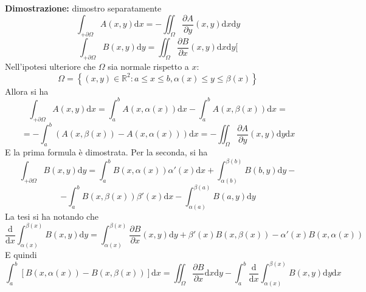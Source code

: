 \documentclass[a4paper,11pt]{article}
\begin{document}
\begin{enumerate}
	\textbf{Dimostrazione:} dimostro separatamente
	\[\int_{+\partial\Omega}A(x,y)\mathrm{d}x=-\iint_\Omega\frac{\partial A}{\partial y}(x,y)\mathrm{d}x\mathrm{d}y\]
	\[\int_{+\partial\Omega}B(x,y)\mathrm{d}y=\iint_\Omega\frac{\partial B}{\partial x}(x,y)\mathrm{d}x\mathrm{d}y[\]
	Nell'ipotesi ulteriore che $\Omega$ sia normale rispetto a $x$:
	\[\Omega=\left\{(x,y)\in\mathbb{R}^2:a\leq x\leq b, \alpha(x)\leq y\leq \beta(x)\right\}\]
	Allora si ha
	\[\int_{+\partial\Omega}A(x,y)\mathrm{d}x=\int_{a}^{b}A(x,\alpha(x))\mathrm{d}x-\int_{a}^{b}A(x,\beta(x))\mathrm{d}x=\]\[=-\int_{a}^{b}\left(A(x,\beta(x))-A(x,\alpha(x))\right)\mathrm{d}x=-\iint_\Omega\frac{\partial A}{\partial y}(x,y)\mathrm{d}y\mathrm{d}x\]
	E la prima formula è dimostrata. Per la seconda, si ha
	\[\int_{+\partial\Omega}B(x,y)\mathrm{d}y=\int_{a}^{b}B(x,\alpha(x))\alpha'(x)\mathrm{d}x+\int_{\alpha(b)}^{\beta(b)}B(b,y)\mathrm{d}y-\]\[-\int_{a}^{b}B(x,\beta(x))\beta'(x)\mathrm{d}x-\int_{\alpha(a)}^{\beta(a)}B(a,y)\mathrm{d}y\]
	La tesi si ha notando che
	\[\frac{\mathrm{d}}{\mathrm{d}x}\int_{\alpha(x)}^{\beta(x)}B(x,y)\mathrm{d}y=\int_{\alpha(x)}^{\beta(x)}\frac{\partial B}{\partial x}(x,y)\mathrm{d}y+\beta'(x)B(x,\beta(x))-\alpha'(x)B(x,\alpha(x))\]
	E quindi 
	\[\int_{a}^{b}\left[B(x,\alpha(x))-B(x,\beta(x))\right]\mathrm{d}x=\iint_\Omega\frac{\partial B}{\partial x}\mathrm{d}x\mathrm{d}y-\int_{a}^{b}\frac{\mathrm{d}}{\mathrm{d}x}\int_{\alpha(x)}^{\beta(x)}B(x,y)\mathrm{d}y\mathrm{d}x\]
	

\end{enumerate}
\end{document}
